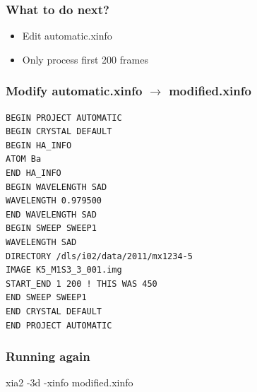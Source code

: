 \documentclass[slides,compress]{beamer}
\begin{document}
\begin{frame}
\frametitle{What to do next?}
\begin{itemize}
\item{Edit automatic.xinfo}
\item{Only process first 200 frames}
\end{itemize}
\end{frame}

\begin{frame}[fragile]
\frametitle{Modify automatic.xinfo $\rightarrow$ modified.xinfo}
{\small
\begin{verbatim}
BEGIN PROJECT AUTOMATIC
BEGIN CRYSTAL DEFAULT
BEGIN HA_INFO
ATOM Ba
END HA_INFO
BEGIN WAVELENGTH SAD
WAVELENGTH 0.979500
END WAVELENGTH SAD
BEGIN SWEEP SWEEP1
WAVELENGTH SAD
DIRECTORY /dls/i02/data/2011/mx1234-5
IMAGE K5_M1S3_3_001.img
START_END 1 200 ! THIS WAS 450
END SWEEP SWEEP1
END CRYSTAL DEFAULT
END PROJECT AUTOMATIC
\end{verbatim}
}
\end{frame}

\begin{frame}
\frametitle{Running again}
\begin{center}
\huge xia2 -3d -xinfo modified.xinfo
\end{center}
\end{frame}
\end{document}
